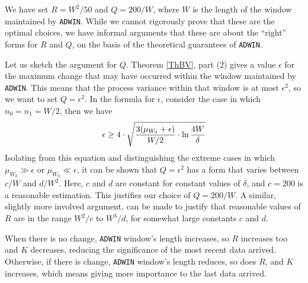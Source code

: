 We have set $R=W^2/50$ and $Q=200/W$, where $W$ is the length of the window
maintained by {\tt ADWIN}. While we cannot rigorously prove that these are the optimal choices, 
we have informal arguments that these are about the ``right'' forms for $R$ and $Q$, on 
the basis of the theoretical guarantees of {\tt ADWIN}. 

Let us sketch the argument for $Q$. Theorem \ref{ThBV}, part (2) gives a value $\epsilon$
for the maximum change that may have occurred within the window maintained 
by {\tt ADWIN}. This means that the process variance within that window is at most $\epsilon^2$, 
so we want to set $Q=\epsilon^2$. 
In the formula for $\epsilon$, consider the case in which $n_0 = n_1 = W/2$, then we have
$$
\epsilon \ge 4\cdot \sqrt{{\frac{3 (\mu_{W_0}+\epsilon)}{W/2}} \cdot \ln{4W\over\delta} }
$$
Isolating from this equation and distinguishing the extreme cases in which 
$\mu_{W_0} \gg \epsilon$ or $\mu_{W_0} \ll \epsilon$, it can be shown that 
$Q=\epsilon^2$ has a form that varies between $c/W$ and $d/W^2$. Here, $c$ and $d$ are constant
for constant values of $\delta$, and $c=200$ is a reasonable estimation. This justifies
our choice of $Q=200/W$. A similar, slightly more involved argument, 
can be made to justify that reasonable values of $R$ are in the range $W^2/c$ to $W^3/d$, 
for somewhat large constants $c$ and $d$.

When there is no change, {\tt ADWIN} window's length increases, 
so $R$ increases too and $K$ decreases, reducing the significance 
of the most recent data arrived. 
Otherwise, if there is change, {\tt ADWIN} window's length reduces, 
so does $R$, and $K$ increases, which means giving more importance to the last data arrived.
